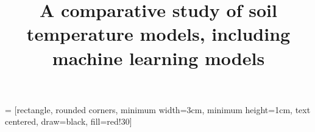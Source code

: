 \usepackage{amssymb}
\usepackage{subfigure}
\usepackage{multirow}
\usepackage{amsmath}
\usepackage{geometry}
\usepackage{tikz}
\usepackage[style=base]{caption}
\usepackage{amsmath,amssymb,amsfonts}
\usepackage{graphicx}

\usepackage[ruled, lined, linesnumbered, commentsnumbered, longend]{algorithm2e}
\usepackage{xcolor}
\usepackage{epsfig}
\usepackage{easyReview}
\usepackage{float}

\usepackage{hyperref}
\usepackage{glossaries}
\usepackage[final]{pdfpages}
\usepackage{multicol}
\usepackage{listings}

\usepackage[inline]{enumitem}

\usepackage[backend=bibtex,citestyle=numeric-comp, bibstyle= ieee,maxnames=99,abbreviate = false,maxcitenames=1,hyperref=true, giveninits=false]{biblatex}



\title{A comparative study of soil temperature models, including machine learning models}

\setlength{\headheight}{20mm}
\setlength{\headsep}{25pt}
\setlength{\voffset}{-2mm}
\usepackage{lastpage}
\usepackage{fancyhdr}
\fancyhf{}
\fancyhead[R]{\leftmark}
\pagestyle{fancy}



\usetikzlibrary{shapes.geometric, arrows}

 = [rectangle, rounded corners, 
minimum width=3cm, 
minimum height=1cm,
text centered, 
draw=black, 
fill=red!30]

